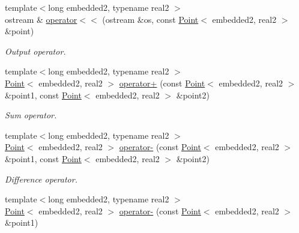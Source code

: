 \begin{DoxyCompactItemize}
\item 
{\footnotesize template$<$long embedded2, typename real2 $>$ }\\ostream \& \hyperlink{class_point_ac6eecb3c92e49e305452771a073acf4c}{operator$<$$<$} (ostream \&os, const \hyperlink{class_point}{Point}$<$ embedded2, real2 $>$ \&point)\hypertarget{class_point_ac6eecb3c92e49e305452771a073acf4c}{}\label{class_point_ac6eecb3c92e49e305452771a073acf4c}

\begin{DoxyCompactList}\small\item\em Output operator. \end{DoxyCompactList}\item 
{\footnotesize template$<$long embedded2, typename real2 $>$ }\\\hyperlink{class_point}{Point}$<$ embedded2, real2 $>$ \hyperlink{class_point_a3ea6134b47e84bd4452443ffde47e70f}{operator+} (const \hyperlink{class_point}{Point}$<$ embedded2, real2 $>$ \&point1, const \hyperlink{class_point}{Point}$<$ embedded2, real2 $>$ \&point2)\hypertarget{class_point_a3ea6134b47e84bd4452443ffde47e70f}{}\label{class_point_a3ea6134b47e84bd4452443ffde47e70f}

\begin{DoxyCompactList}\small\item\em Sum operator. \end{DoxyCompactList}\item 
{\footnotesize template$<$long embedded2, typename real2 $>$ }\\\hyperlink{class_point}{Point}$<$ embedded2, real2 $>$ \hyperlink{class_point_ab65b17238ecddcc87348a5e9c55892f3}{operator-\/} (const \hyperlink{class_point}{Point}$<$ embedded2, real2 $>$ \&point1, const \hyperlink{class_point}{Point}$<$ embedded2, real2 $>$ \&point2)\hypertarget{class_point_ab65b17238ecddcc87348a5e9c55892f3}{}\label{class_point_ab65b17238ecddcc87348a5e9c55892f3}

\begin{DoxyCompactList}\small\item\em Difference operator. \end{DoxyCompactList}\item 
{\footnotesize template$<$long embedded2, typename real2 $>$ }\\\hyperlink{class_point}{Point}$<$ embedded2, real2 $>$ \hyperlink{class_point_aadb04db36a16719114875b8a267ca639}{operator-\/} (const \hyperlink{class_point}{Point}$<$ embedded2, real2 $>$ \&point1)\hypertarget{class_point_aadb04db36a16719114875b8a267ca639}{}\label{class_point_aadb04db36a16719114875b8a267ca639}


\end{DoxyCompactItemize}

